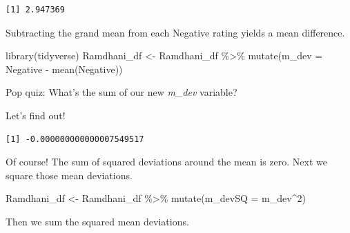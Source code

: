 \documentclass[
  11pt,
]{book}
\newenvironment{Shaded}{\begin{snugshade}}{\end{snugshade}}
\newcommand{\AttributeTok}[1]{\textcolor[rgb]{0.77,0.63,0.00}{#1}}
\newcommand{\DecValTok}[1]{\textcolor[rgb]{0.00,0.00,0.81}{#1}}
\newcommand{\FunctionTok}[1]{\textcolor[rgb]{0.00,0.00,0.00}{#1}}
\newcommand{\NormalTok}[1]{#1}
\newcommand{\OtherTok}[1]{\textcolor[rgb]{0.56,0.35,0.01}{#1}}
\newcommand{\SpecialCharTok}[1]{\textcolor[rgb]{0.00,0.00,0.00}{#1}}
\begin{document}
\begin{verbatim}
[1] 2.947369
\end{verbatim}

Subtracting the grand mean from each Negative rating yields a mean difference.

\begin{Shaded}
\begin{Highlighting}[]
\FunctionTok{library}\NormalTok{(tidyverse)}
\NormalTok{Ramdhani\_df }\OtherTok{\textless{}{-}}\NormalTok{ Ramdhani\_df }\SpecialCharTok{\%\textgreater{}\%}
    \FunctionTok{mutate}\NormalTok{(}\AttributeTok{m\_dev =}\NormalTok{ Negative }\SpecialCharTok{{-}} \FunctionTok{mean}\NormalTok{(Negative))}
\end{Highlighting}
\end{Shaded}

Pop quiz: What's the sum of our new \emph{m\_dev} variable?

Let's find out!

\begin{Shaded}
\end{Shaded}

\begin{verbatim}
[1] -0.000000000000007549517
\end{verbatim}

Of course! The sum of squared deviations around the mean is zero. Next we square those mean deviations.

\begin{Shaded}
\begin{Highlighting}[]
\NormalTok{Ramdhani\_df }\OtherTok{\textless{}{-}}\NormalTok{ Ramdhani\_df }\SpecialCharTok{\%\textgreater{}\%}
    \FunctionTok{mutate}\NormalTok{(}\AttributeTok{m\_devSQ =}\NormalTok{ m\_dev}\SpecialCharTok{\^{}}\DecValTok{2}\NormalTok{)}
\end{Highlighting}
\end{Shaded}

Then we sum the squared mean deviations.

\begin{Shaded}
\end{Shaded}
\end{document}
